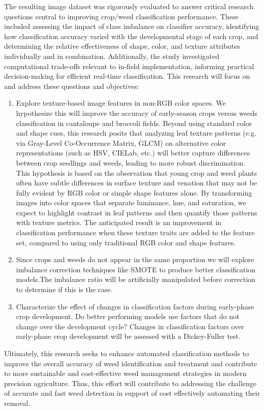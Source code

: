 \documentclass[letterpaper, notitlepage]{report}
\begin{document}
The resulting image dataset was rigorously evaluated to answer critical research questions central to improving crop/weed classification performance. These included assessing the impact of class imbalance on classifier accuracy, identifying how classification accuracy varied with the developmental stage of each crop, and determining the relative effectiveness of shape, color, and texture attributes individually and in combination. Additionally, the study investigated computational trade-offs relevant to in-field implementation, informing practical decision-making for efficient real-time classification. This research will focus on and address these questions and objectives:
\begin{enumerate}
	\item{Explore texture-based image features in non-RGB color spaces. We hypothesize this will improve the accuracy of early-season crops versus weeds classification in cantaloupe and broccoli fields. Beyond using standard color and shape cues, this research posits that analyzing leaf texture patterns (e.g. via Gray-Level Co-Occurrence Matrix, GLCM) on alternative color representations (such as HSV, CIELab, etc.) will better capture differences between crop seedlings and weeds, leading to more robust discrimination. This hypothesis is based on the observation that young crop and weed plants often have subtle differences in surface texture and venation that may not be fully evident by RGB color or simple shape features alone. By transforming images into color spaces that separate luminance, hue, and saturation, we expect to highlight contrast in leaf patterns and then quantify those patterns with texture metrics. The anticipated result is an improvement in classification performance when these texture traits are added to the feature set, compared to using only traditional RGB color and shape features.}
	\item{Since crops and weeds do not appear in the same proportion we will explore imbalance correction techniques like SMOTE to produce better classification models.The imbalance ratio will be artificially manipulated before correction to determine if this is the case.}
	\item{Characterize the effect of changes in classification factors during early-phase crop development. Do better performing models use factors that do not change over the development cycle? Changes in classification factors over early-phase crop development will be assessed with a Dickey-Fuller test.}
\end{enumerate}
Ultimately, this research seeks to enhance automated classification methods to improve the overall accuracy of weed identification and treatment and contribute to more sustainable and cost-effective weed management strategies in modern precision agriculture. Thus, this effort will contribute to addressing the challenge of accurate and fast weed detection in support of cost effectively automating their removal.
\end{document}
